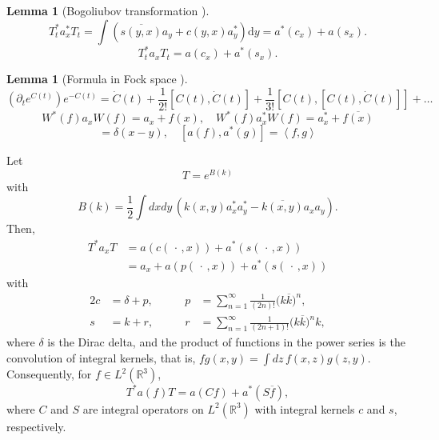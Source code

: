 \documentclass[11pt,a4paper]{scrartcl} %
\newtheorem{lem}[thm]{Lemma}
\newcommand{\R}{\mathds{R}}
\newcommand{\di}{\textrm{d}}		%
\newcommand{\scal}[2]{\left<#1,#2\right>} %
\newcommand{\cc}[1]{\overline{#1}}	%
\newcommand{\bd}{\begin{displaymath}}			%
\newcommand{\ed}{\end{displaymath}}
\begin{document}
\begin{lem}[Bogoliubov transformation \cite{GMM2010}]
\label{lem:bogoliubovtransformation}
 \bd
 T_t^* a^*_x T_t = \int \left( \cc{s(y,x)} a_y + c(y,x) a^*_y \right) \di y =
 a^*(c_x) + a(s_x).
 \ed
\bd
 T_t^* a_x T_t = a(c_x) + a^*(s_x).
\ed
\end{lem}


\begin{lem}[Formula in Fock space \cite{RS2009}]
\bd
\left(\partial_t e^{C(t)} \right) e^{-C(t)} = \dot C(t) +
\frac{1}{2!}[C(t),\dot C(t)]+ \frac{1}{3!}[C(t),[C(t),\dot C(t)]] + \dots
\ed
\bd
W^*(f) a_x W(f) = a_x + f(x), \quad W^*(f)a^*_x W(f) = a^*_x + \cc{f(x)}
\ed
\bd
[a_x,a^*_y] = \delta(x-y), \quad [a(f),a^*(g)] = \scal{f}{g}
\ed
\end{lem}


Let
\[
  T = e^{B(k)}
\]
with
\[
  B(k) = \frac{1}{2} \int dxdy \, (k(x,y) a_x^* a_y^* - \overline{k(x,y)} a_x
  a_y).
\]
Then,
\begin{align*}
  T^* a_x T & = a(c(\,\cdot\,,x)) + a^*(s(\,\cdot\,,x)) \\
  & = a_x + a(p(\,\cdot\,,x)) + a^*(s(\,\cdot\,,x))
\end{align*}
with
\begin{alignat*}{2}
  c & = \delta + p, & \qquad p & = \sum_{n=1}^\infty \frac{1}{(2n)!} \big( k
  \overline{k} \big)^n, \\
  s & = k + r, & \qquad r & = \sum_{n=1}^\infty \frac{1}{(2n+1)!} \big( k
  \overline{k} \big)^n k,
\end{alignat*}
where $\delta$ is the Dirac delta, and the product of functions in the power
series is the convolution of integral kernels, that is, $fg(x,y) = \int dz \,
f(x,z) g(z,y)$. Consequently, for $f \in L^2(\R^3)$,
\[
  T^* a(f) T = a(Cf) + a^*(S\overline{f}),
\]
where $C$ and $S$ are integral operators on $L^2(\R^3)$ with integral kernels
$c$ and $s$, respectively.
\end{document}
